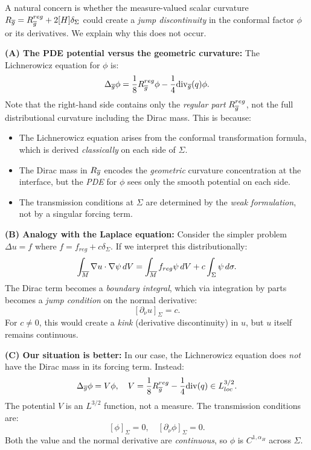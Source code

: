 \begin{remark}\label{rem:DiracNoDestroy}
A natural concern is whether the measure-valued scalar curvature $R_{\overline{g}} = R_{\overline{g}}^{reg} + 2[H]\delta_\Sigma$ could create a \emph{jump discontinuity} in the conformal factor $\phi$ or its derivatives. We explain why this does not occur.

\textbf{(A) The PDE potential versus the geometric curvature:}
The Lichnerowicz equation for $\phi$ is:
\[
    \Delta_{\overline{g}} \phi = \frac{1}{8} R_{\overline{g}}^{reg} \phi - \frac{1}{4}\mathrm{div}_{\overline{g}}(q) \phi.
\]
Note that the right-hand side contains only the \emph{regular part} $R_{\overline{g}}^{reg}$, not the full distributional curvature including the Dirac mass. This is because:
\begin{itemize}
    \item The Lichnerowicz equation arises from the conformal transformation formula, which is derived \emph{classically} on each side of $\Sigma$.
    \item The Dirac mass in $R_{\overline{g}}$ encodes the \emph{geometric} curvature concentration at the interface, but the \emph{PDE} for $\phi$ sees only the smooth potential on each side.
    \item The transmission conditions at $\Sigma$ are determined by the \emph{weak formulation}, not by a singular forcing term.
\end{itemize}

\textbf{(B) Analogy with the Laplace equation:}
Consider the simpler problem $\Delta u = f$ where $f = f_{reg} + c\delta_\Sigma$. If we interpret this distributionally:
\[
    \int_{\overline{M}} \nabla u \cdot \nabla \psi \, dV = \int_{\overline{M}} f_{reg} \psi \, dV + c \int_\Sigma \psi \, d\sigma.
\]
The Dirac term becomes a \emph{boundary integral}, which via integration by parts becomes a \emph{jump condition} on the normal derivative:
\[
    [\partial_\nu u]_\Sigma = c.
\]
For $c \ne 0$, this would create a \emph{kink} (derivative discontinuity) in $u$, but $u$ itself remains continuous.

\textbf{(C) Our situation is better:}
In our case, the Lichnerowicz equation does \emph{not} have the Dirac mass in its forcing term. Instead:
\[
    \Delta_{\overline{g}} \phi = V \phi, \quad V = \frac{1}{8}R_{\overline{g}}^{reg} - \frac{1}{4}\mathrm{div}(q) \in L^{3/2}_{loc}.
\]
The potential $V$ is an $L^{3/2}$ function, not a measure. The transmission conditions are:
\[
    [\phi]_\Sigma = 0, \quad [\partial_\nu \phi]_\Sigma = 0.
\]
Both the value and the normal derivative are \emph{continuous}, so $\phi$ is $C^{1,\alpha_H}$ across $\Sigma$.


\end{remark}
